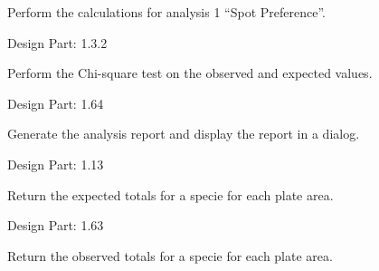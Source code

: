 \documentclass[letterpaper,10pt,english]{sphinxmanual}
\begin{document}

\begin{fulllineitems}
\label{setlyze/analysis/spot_preference:setlyze.analysis.spot_preference.Start}
Perform the calculations for analysis 1 ``Spot Preference''.

Design Part: 1.3.2

\begin{fulllineitems}
\label{setlyze/analysis/spot_preference:setlyze.analysis.spot_preference.Start.chi_square_tester}
Perform the Chi-square test on the observed and expected values.

Design Part: 1.64

\end{fulllineitems}


\begin{fulllineitems}
\label{setlyze/analysis/spot_preference:setlyze.analysis.spot_preference.Start.generate_report}
Generate the analysis report and display the report in a dialog.

Design Part: 1.13

\end{fulllineitems}


\begin{fulllineitems}
\label{setlyze/analysis/spot_preference:setlyze.analysis.spot_preference.Start.get_areas_totals_expected}
Return the expected totals for a specie for each plate area.

Design Part: 1.63

\end{fulllineitems}


\begin{fulllineitems}
\label{setlyze/analysis/spot_preference:setlyze.analysis.spot_preference.Start.get_areas_totals_observed}
Return the observed totals for a specie for each plate area.


\end{fulllineitems}
\end{fulllineitems}
\end{document}
